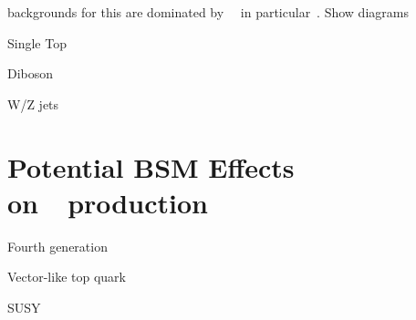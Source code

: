 \par backgrounds for this are dominated by ~\ttjets~in
particular~\ttbb.  Show diagrams

\par Single Top

\par Diboson

\par W/Z jets


\section{Potential BSM Effects on~\ttH~production}
\label{bsm_effects_overview}

\par Fourth generation

\par Vector-like top quark

\par SUSY

      
